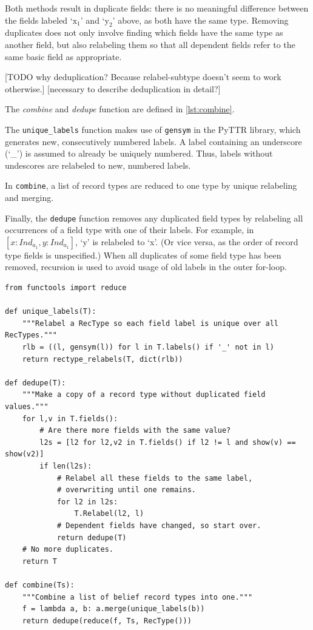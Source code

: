 Both methods result in duplicate fields: there is no meaningful difference between the fields labeled `$\text{x}_1$' and `$\text{y}_2$' above, as both have the same type.
Removing duplicates does not only involve finding which fields have the same type as another field, but also relabeling them so that all dependent fields refer to the same basic field as appropriate.

[TODO why deduplication? Because relabel-subtype doesn't seem to work otherwise.]
[necessary to describe deduplication in detail?]

The \textit{combine} and \textit{dedupe} function are defined in \autoref{lst:combine}.

The \texttt{unique\_labels} function makes use of \texttt{gensym} in the PyTTR library, which generates new, consecutively numbered labels.
A label containing an underscore (`\_') is assumed to already be uniquely numbered.
Thus, labels without undescores are relabeled to new, numbered labels.

In \texttt{combine}, a list of record types are reduced to one type by unique relabeling and merging.

Finally, the \texttt{dedupe} function removes any duplicated field types by relabeling all occurrences of a field type with one of their labels. For example, in $[x:Ind_{a_1}, y:Ind_{a_1}]$, `y' is relabeled to `x'.
(Or vice versa, as the order of record type fields is unspecified.)
When all duplicates of some field type has been removed, recursion is used to avoid usage of old labels in the outer for-loop.

\begin{lstlisting}[label={lst:combine}, caption=The \texttt{combine} and \texttt{dedupe} functions.]
from functools import reduce

def unique_labels(T):
    """Relabel a RecType so each field label is unique over all RecTypes."""
    rlb = ((l, gensym(l)) for l in T.labels() if '_' not in l)
    return rectype_relabels(T, dict(rlb))

def dedupe(T):
    """Make a copy of a record type without duplicated field values."""
    for l,v in T.fields():
        # Are there more fields with the same value?
        l2s = [l2 for l2,v2 in T.fields() if l2 != l and show(v) == show(v2)]
        if len(l2s):
            # Relabel all these fields to the same label,
			# overwriting until one remains.
            for l2 in l2s:
                T.Relabel(l2, l)
            # Dependent fields have changed, so start over.
            return dedupe(T)
    # No more duplicates.
    return T

def combine(Ts):
    """Combine a list of belief record types into one."""
    f = lambda a, b: a.merge(unique_labels(b))
    return dedupe(reduce(f, Ts, RecType()))
\end{lstlisting}



